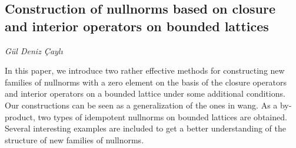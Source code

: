 \documentclass[../booklet.tex]{subfiles}
\begin{document}
\subsection[Construction of nullnorms based on closure and interior operators on bounded lattices. {\it Gül Deniz Çaylı}]{Construction of nullnorms based on closure and interior operators on bounded lattices}

\begin{center}
  {\it Gül Deniz Çaylı}
\end{center}

\vskip 0.8cm


In this paper, we introduce two rather effective methods for constructing new families of nullnorms
with a zero element on the basis of the closure operators and interior operators on a
bounded lattice under some additional conditions. Our constructions can be seen as a
generalization of the ones in wang. As a by-product, two types of idempotent nullnorms
on bounded lattices are obtained. Several interesting examples are included to get a better
understanding of the structure of new families of nullnorms.

\end{document}
